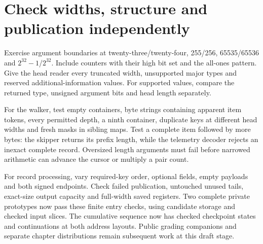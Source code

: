 \section{Check widths, structure and publication independently}
Exercise argument boundaries at twenty-three/twenty-four, 255/256, 65535/65536 and
$2^{32}-1$/$2^{32}$. Include counters with their high bit set and the all-ones pattern.
Give the head reader every truncated width, unsupported major types and reserved
additional-information values. For supported values, compare the returned type,
unsigned argument bits and head length separately.

For the walker, test empty containers, byte strings containing apparent item tokens,
every permitted depth, a ninth container, duplicate keys at different head widths and
fresh masks in sibling maps. Test a complete item followed by more bytes: the skipper
returns its prefix length, while the telemetry decoder rejects an inexact complete
record. Oversized length arguments must fail before narrowed arithmetic can advance
the cursor or multiply a pair count.

For record processing, vary required-key order, optional fields, empty payloads and
both signed endpoints. Check failed publication, untouched unused tails, exact-size
output capacity and full-width saved registers. Two complete private prototypes now pass these finite entry checks, using candidate
storage and checked input slices. The cumulative sequence now has checked checkpoint states and continuations at both
address layouts. Public grading companions and separate chapter distributions remain
subsequent work at this draft stage.
